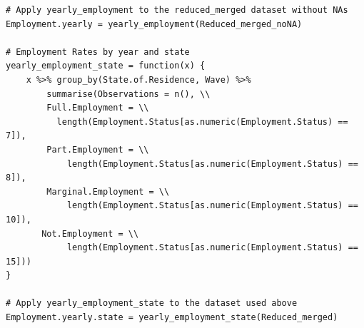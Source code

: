 \documentclass[a4paper]{article}
\begin{document}
{\begin{lstlisting}
# Apply yearly_employment to the reduced_merged dataset without NAs
Employment.yearly = yearly_employment(Reduced_merged_noNA)

# Employment Rates by year and state
yearly_employment_state = function(x) {
    x %>% group_by(State.of.Residence, Wave) %>% 
    	summarise(Observations = n(), \\
        Full.Employment = \\
          length(Employment.Status[as.numeric(Employment.Status) == 7]), 
        Part.Employment = \\
            length(Employment.Status[as.numeric(Employment.Status) == 8]), 
        Marginal.Employment = \\
            length(Employment.Status[as.numeric(Employment.Status) == 10]), 
       Not.Employment = \\
            length(Employment.Status[as.numeric(Employment.Status) == 15]))
}

# Apply yearly_employment_state to the dataset used above
Employment.yearly.state = yearly_employment_state(Reduced_merged)


\end{lstlisting}}
\end{document}
